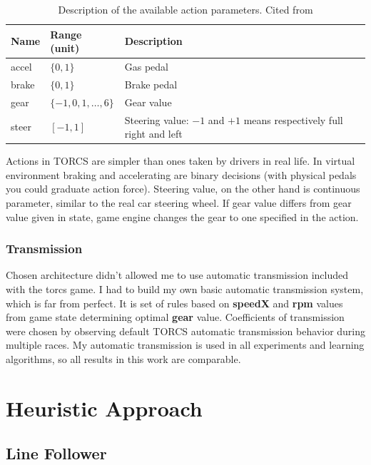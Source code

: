 \documentclass[declaration,shortabstract,english,inz]{iithesis}
\begin{document}
\begin{table}[h]
    \centering
    \begin{tabular}{|p{1.2cm}|p{2.8cm}|p{8.5cm}|}
        \hline
        \textbf{Name} & \textbf{Range (unit)} & \textbf{Description} \\ 
        \hline
        accel & $\{0,1\}$ & Gas pedal \\ 
     \hline
     brake &  $\{0,1\}$ & Brake pedal \\ 
     \hline
     gear & $\{-1,0,1,\dots ,6\}$ & Gear value \\ 
     \hline
     steer &  $[-1,1]$ & Steering value: $-1$ and $+1$ means respectively full right and
     left \\ 
     \hline
    \end{tabular}
    
    \caption{\label{tab:torcs_actions}Description of the available  action parameters. Cited from \cite{scrc_manual}}
\end{table}

Actions in TORCS are simpler than ones taken by drivers in real life.
In virtual environment braking and accelerating are binary decisions (with physical pedals you could graduate action force).
Steering value, on the other hand is continuous parameter, similar to the real car steering wheel.
If gear value differs from  gear value given in state, game engine changes the gear to one specified in the action.

\subsection{Transmission}


Chosen architecture didn’t allowed me to use automatic transmission included with the torcs game.
I had to build my own basic automatic transmission system, which is far from perfect.
It is set of rules based on \textbf{speedX} and \textbf{rpm} values from game state determining optimal \textbf{gear} value.
Coefficients of transmission were chosen by observing default TORCS automatic transmission behavior during multiple races.
My automatic transmission is used in all experiments and learning algorithms, so all results in this work are comparable.


\chapter{Heuristic Approach}

\section{Line Follower}
\end{document}
